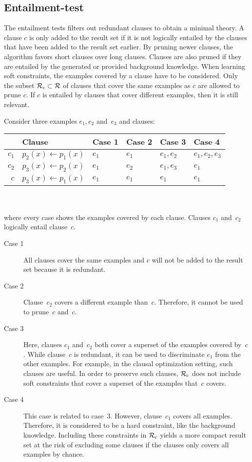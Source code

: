 \subsection{Entailment-test}
The entailment tests filters out redundant clauses to obtain a minimal theory.
A clause $c$ is only added to the result set  if it is not logically entailed by the clauses that have been added to the result set earlier.
By pruning newer clauses, the algorithm favors short clauses over long clauses.
Clauses are also pruned if they are entailed by the generated or provided background knowledge.
When learning soft constraints, the examples covered by a clause have to be considered.
Only the subset $\mathcal{R}_c \subset \mathcal{R}$ of clauses that cover the same examples as $c$ are allowed to prune $c$.
If $c$ is entailed by clauses that cover different examples, then it is still relevant.
\begin{example}
	Consider three examples $e_1, e_2$ and~$e_3$ and clauses:\\

	\begin{tabular}{rl|llll}
		& Clause & Case 1 & Case 2 & Case 3 & Case 4 \\
		\midrule
		$c_1$ & $p_2(x) \leftarrow p_1(x)$ & $e_1$ & $e_1$ & $e_1, e_2$ & $e_1, e_2, e_3$\\
		$c_2$ & $p_3(x) \leftarrow p_2(x)$ & $e_1$ & $e_2$ & $e_1, e_3$ & $e_1$ \\
		$c$ & $p_3(x) \leftarrow p_1(x)$ & $e_1$ & $e_1$ & $e_1$ & $e_1$
	\end{tabular}
	\\\\
	where every case shows the examples covered by each clause.
	Clauses $c_1$ and~$c_2$ logically entail clause~$c$.

	\begin{description}
		\item[Case 1]
			All clauses cover the same examples and $c$ will not be added to the result set because it is redundant.
		\item[Case 2]
			Clause~$c_2$ covers a different example than~$c$.
			Therefore, it cannot be used to prune~$c$ and~$c$.
		\item[Case 3]
			Here, clauses $c_1$ and~$c_2$ both cover a superset of the examples covered by~$c$.
			While clause~$c$ is redundant, it can be used to discriminate $e_1$ from the other examples.
			For example, in the clausal optimization setting, such clauses are useful.
			In order to preserve such clauses, $\mathcal{R}_c$ does not include soft constraints that cover a superset of the examples that~$c$ covers.
		\item[Case 4]
			This case is related to case~3.
			However, clause~$c_1$ covers all examples.
			Therefore, it is considered to be a hard constraint, like the background knowledge.
			Including these constraints in $\mathcal{R}_c$ yields a more compact result set at the risk of excluding some clauses if the clauses only covers all examples by chance.
	\end{description}

\end{example}

